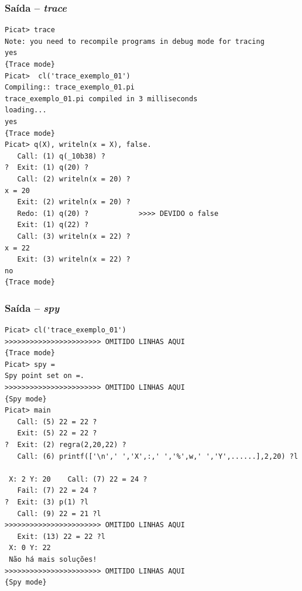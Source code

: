 
\begin{frame}[fragile]

\frametitle{Saída -- \textit{trace}}

\begin{scriptsize}
\begin{verbatim}
Picat> trace
Note: you need to recompile programs in debug mode for tracing
yes
{Trace mode}
Picat>  cl('trace_exemplo_01')
Compiling:: trace_exemplo_01.pi
trace_exemplo_01.pi compiled in 3 milliseconds
loading...
yes
{Trace mode}
Picat> q(X), writeln(x = X), false.
   Call: (1) q(_10b38) ?
?  Exit: (1) q(20) ?
   Call: (2) writeln(x = 20) ?
x = 20
   Exit: (2) writeln(x = 20) ?
   Redo: (1) q(20) ?            >>>> DEVIDO o false
   Exit: (1) q(22) ?
   Call: (3) writeln(x = 22) ?
x = 22
   Exit: (3) writeln(x = 22) ?
no
{Trace mode}
\end{verbatim}
\end{scriptsize}
\end{frame}


\begin{frame}[fragile]

\frametitle{Saída -- \textit{spy}}

\begin{scriptsize}
\begin{verbatim}
Picat> cl('trace_exemplo_01')
>>>>>>>>>>>>>>>>>>>>>>> OMITIDO LINHAS AQUI
{Trace mode}
Picat> spy =    
Spy point set on =.
>>>>>>>>>>>>>>>>>>>>>>> OMITIDO LINHAS AQUI
{Spy mode}
Picat> main
   Call: (5) 22 = 22 ?
   Exit: (5) 22 = 22 ?
?  Exit: (2) regra(2,20,22) ?
   Call: (6) printf(['\n',' ','X',:,' ','%',w,' ','Y',......],2,20) ?l

 X: 2 Y: 20    Call: (7) 22 = 24 ?
   Fail: (7) 22 = 24 ?
?  Exit: (3) p(1) ?l
   Call: (9) 22 = 21 ?l
>>>>>>>>>>>>>>>>>>>>>>> OMITIDO LINHAS AQUI  
   Exit: (13) 22 = 22 ?l
 X: 0 Y: 22 
 Não há mais soluções! 
>>>>>>>>>>>>>>>>>>>>>>> OMITIDO LINHAS AQUI
{Spy mode}
\end{verbatim}
\end{scriptsize}
\end{frame}




